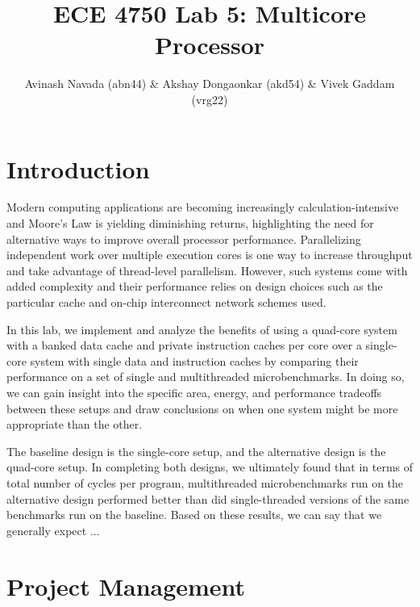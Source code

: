 \documentclass[10pt]{article}
\begin{document}
\title{ECE 4750 Lab 5: Multicore Processor}
\author{Avinash Navada (abn44) \& Akshay Dongaonkar (akd54) 
		\& Vivek Gaddam (vrg22)}
\maketitle


\section{Introduction}

Modern computing applications are becoming increasingly calculation-intensive and Moore's Law is yielding diminishing returns, highlighting the need for alternative ways to improve overall processor performance. Parallelizing independent work over multiple execution cores is one way to increase throughput and take advantage of thread-level parallelism. However, such systems come with added complexity and their performance relies on design choices such as the particular
cache and on-chip interconnect network schemes used. \par

In this lab, we implement and analyze the benefits of using a quad-core system with a banked data cache and private instruction caches per core over a single-core system with single data and instruction caches by comparing their performance on a set of single and multithreaded microbenchmarks. In doing so, we can gain insight into the specific area, energy, and performance tradeoffs between these setups and draw conclusions on when one system might be more appropriate than the other. \par

The baseline design is the single-core setup, and the alternative design is the quad-core setup. In completing both designs, we ultimately found that in terms of total number of cycles per program, multithreaded microbenchmarks run on the alternative design performed better than did single-threaded versions of the same benchmarks run on the baseline.
Based on these results, we can say that we generally expect ...



\section{Project Management}
\end{document}
